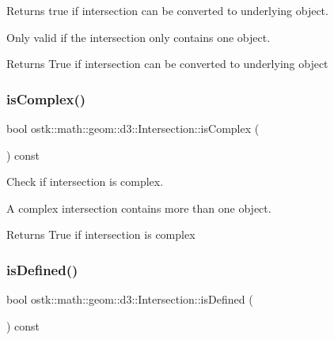 Returns true if intersection can be converted to underlying object. 

Only valid if the intersection only contains one object.

\begin{DoxyReturn}{Returns}
True if intersection can be converted to underlying object 
\end{DoxyReturn}
\mbox{\label{classostk_1_1math_1_1geom_1_1d3_1_1_intersection_a2be4921f5127bd936763d1e58b8c5b08}} 
\subsubsection{\texorpdfstring{is\+Complex()}{isComplex()}}
{\footnotesize\ttfamily bool ostk\+::math\+::geom\+::d3\+::\+Intersection\+::is\+Complex (\begin{DoxyParamCaption}{ }\end{DoxyParamCaption}) const}



Check if intersection is complex. 

A complex intersection contains more than one object.

\begin{DoxyReturn}{Returns}
True if intersection is complex 
\end{DoxyReturn}
\mbox{\label{classostk_1_1math_1_1geom_1_1d3_1_1_intersection_a0bad84b69668b30377158b83e80392a1}} 
\subsubsection{\texorpdfstring{is\+Defined()}{isDefined()}}
{\footnotesize\ttfamily bool ostk\+::math\+::geom\+::d3\+::\+Intersection\+::is\+Defined (\begin{DoxyParamCaption}{ }\end{DoxyParamCaption}) const}



